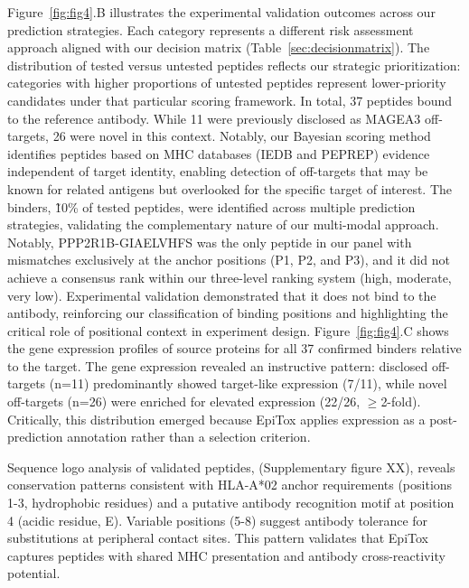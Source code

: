\documentclass[unnumsec,webpdf,contemporary,large]{oup-authoring-template}%
\theoremstyle{thmstyleone}%
\theoremstyle{thmstyletwo}%
\theoremstyle{thmstylethree}%
\begin{document}
        Figure~\ref{fig:fig4}.B illustrates the experimental validation outcomes across our prediction strategies. Each category represents a different risk assessment approach aligned with our decision matrix (Table~\ref{sec:decisionmatrix}). The distribution of tested versus untested peptides reflects our strategic prioritization: categories with higher proportions of untested peptides represent lower-priority candidates under that particular scoring framework. In total, 37 peptides bound to the reference antibody. While 11 were previously disclosed as MAGEA3 off-targets, 26 were novel in this context. Notably, our Bayesian scoring method identifies peptides based on MHC databases (IEDB and PEPREP) evidence independent of target identity, enabling detection of off-targets that may be known for related antigens but overlooked for the specific target of interest. 
        The binders, \~10\% of tested peptides, were identified across multiple prediction strategies, validating the complementary nature of our multi-modal approach. 
        Notably, PPP2R1B-GIAELVHFS was the only peptide in our panel with mismatches exclusively at the anchor positions (P1, P2, and P3), and it did not achieve a consensus rank within our three-level ranking system (high, moderate, very low). Experimental validation demonstrated that it does not bind to the antibody, reinforcing our classification of binding positions and highlighting the critical role of positional context in experiment design.
        Figure~\ref{fig:fig4}.C shows the gene expression profiles of source proteins for all 37 confirmed binders relative to the target. The gene expression revealed an instructive pattern: disclosed off-targets (n=11) predominantly showed target-like expression (7/11), while novel off-targets (n=26) were enriched for elevated expression (22/26, $\geq$2-fold). Critically, this distribution emerged because EpiTox applies expression as a post-prediction annotation rather than a selection criterion.

        Sequence logo analysis of validated peptides, (Supplementary figure XX), reveals conservation patterns consistent with HLA-A*02 anchor requirements (positions 1-3, hydrophobic residues) and a putative antibody recognition motif at position 4 (acidic residue, E). Variable positions (5-8) suggest antibody tolerance for substitutions at peripheral contact sites. This pattern validates that EpiTox captures peptides with shared MHC presentation and antibody cross-reactivity potential.
\end{document}
